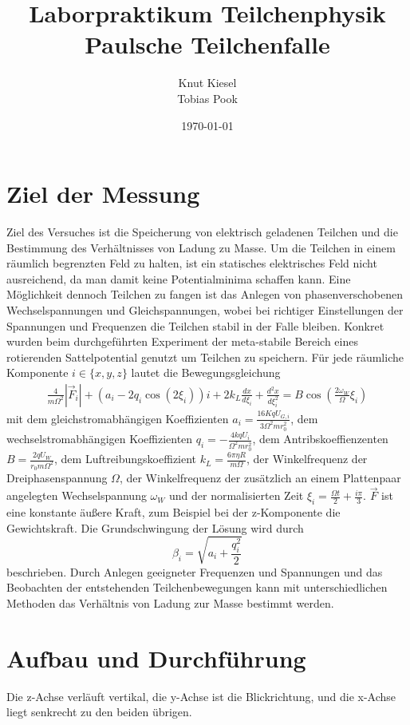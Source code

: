 \documentclass[a4paper,12pt]{article}
\title{Laborpraktikum Teilchenphysik\\ Paulsche Teilchenfalle}
\author{Knut Kiesel\\Tobias Pook}
\date{\today}
\begin{document}
\maketitle
\vspace{5cm}
\tableofcontents
\thispagestyle{empty}
\newpage
\setcounter{page}{1}

\section{Ziel der Messung} %
Ziel des Versuches ist die Speicherung von elektrisch geladenen Teilchen und die Bestimmung des Verhältnisses von Ladung zu Masse.
Um die Teilchen in einem räumlich begrenzten Feld zu halten, ist ein statisches elektrisches Feld nicht ausreichend, da man damit keine Potentialminima schaffen kann.
Eine Möglichkeit dennoch Teilchen zu fangen ist das Anlegen von phasenverschobenen Wechselspannungen und Gleichspannungen, wobei bei richtiger Einstellungen der Spannungen und Frequenzen die Teilchen stabil in der Falle bleiben.
Konkret wurden beim durchgeführten Experiment der meta-stabile Bereich eines rotierenden Sattelpotential genutzt um Teilchen zu speichern.
Für jede räumliche Komponente $i\in\{x,y,z\}$ lautet die Bewegungsgleichung
\begin{align}\label{mastergleichung}
	\frac{4}{mΩ^2} |\vec{F}_i| + \left( a_i -2q_i \cos\left( 2\xi_i \right) \right) i  + 2k_L \frac{dx}{d\xi_i} + \frac{d^2x}{d\xi_i^2} = B\cos\left( \frac{2ω_W}{Ω}ξ_i \right)
\end{align}
mit dem gleichstromabhängigen Koeffizienten $a_i = \frac{16KqU_{G,i}}{3Ω^2mr_0^2}$,
dem wechselstromabhängigen Koeffizienten  $q_i = -\frac{4kqU_i}{Ω^2mr_0^2}$,
dem Antribskoeffienzenten $B = \frac{2qU_W}{r_0mΩ^2}$,
dem Luftreibungskoeffizient $k_L = \frac{6πηR}{mΩ}$, der Winkelfrequenz der Dreiphasenspannung $Ω$,
der Winkelfrequenz der zusätzlich an einem Plattenpaar angelegten Wechselspannung $ω_W$
und der normalisierten Zeit $ξ_i = \frac{Ωt}{2} + \frac{iπ}{3}$.
$\vec{F}$ ist eine konstante äußere Kraft, zum Beispiel bei der z-Komponente die Gewichtskraft.
Die Grundschwingung der Lösung wird durch
$$β_i = \sqrt{a_i + \frac{q_i^2}{2}}$$
beschrieben.
Durch Anlegen geeigneter Frequenzen und Spannungen und das Beobachten der entstehenden Teilchenbewegungen kann mit unterschiedlichen Methoden das Verhältnis von Ladung zur Masse bestimmt werden.


\section{Aufbau und Durchführung}
Die z-Achse verläuft vertikal, die y-Achse ist die Blickrichtung, und die x-Achse liegt senkrecht zu den beiden übrigen.
\end{document}
